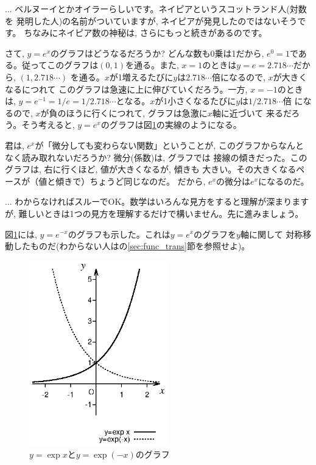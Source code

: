 \begin{faq}{\small{} ... 
ベルヌーイとかオイラーらしいです。ネイピアというスコットランド人(対数を
発明した人)の名前がついていますが, ネイピアが発見したのではないそうです。
ちなみにネイピア数の神秘は, さらにもっと続きがあるのです。}\end{faq}

さて, $y=e^x$のグラフはどうなるだろうか? どんな数も0乗は1だから, 
$e^0=1$である。従ってこのグラフは$(0, 1)$を通る。また, $x=1$のときは$y=e=2.718\cdots$だから, $(1, 2.718\cdots)$
を通る。$x$が1増えるたびに$y$は$2.718\cdots$倍になるので, $x$が大きくなるにつれて
このグラフは急速に上に伸びていくだろう。一方, $x=-1$のときは, 
$y=e^{-1}=1/e=1/2.718\cdots$となる。$x$が1小さくなるたびに$y$は$1/2.718\cdots$倍
になるので, $x$が負のほうに行くにつれて, グラフは急激に$x$軸に近づいて
来るだろう。そう考えると, $y=e^x$のグラフは図\ref{fig:y_expx}の実線のようになる。

君は, $e^x$が「微分しても変わらない関数」ということが, 
このグラフからなんとなく読み取れないだろうか? 微分(係数)は, グラフでは
接線の傾きだった。このグラフは, 右に行くほど, 値が大きくなるが, 傾きも
大きい。その大きくなるペースが（値と傾きで）ちょうど同じなのだ。
だから, $e^x$の微分は$e^x$になるのだ。

\begin{faq}{\small{} ... 
わからなければスルーでOK。数学はいろんな見方をすると理解が深まりますが, 
難しいときは1つの見方を理解するだけで構いません。先に進みましょう。}\end{faq}

図\ref{fig:y_expx}には, $y=e^{-x}$のグラフも示した。これは$y=e^x$のグラフを$y$軸に関して
対称移動したものだ(わからない人はの\ref{sec:func_trans}節を参照せよ)。\\
\begin{figure}[h]
    \centering
    \includegraphics[width=6.0cm]{exp.eps}
    \caption{$y=\exp x$と$y=\exp(-x)$のグラフ}\label{fig:y_expx}
\end{figure}

